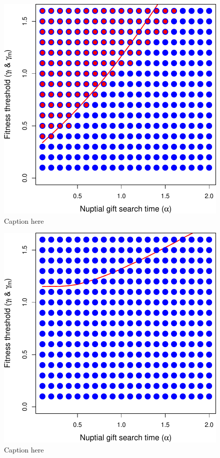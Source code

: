 \documentclass[
]{article}
\begin{document}
\begin{figure}
\centering
\includegraphics{ms_refs_fixed_files/figure-latex/unnamed-chunk-13-1.pdf}
\caption{Caption here}
\end{figure}

\captionsetup{labelformat=default}

\clearpage

\captionsetup{labelformat=empty}

\begin{figure}
\centering
\includegraphics{ms_refs_fixed_files/figure-latex/unnamed-chunk-14-1.pdf}
\caption{Caption here}
\end{figure}
\end{document}
